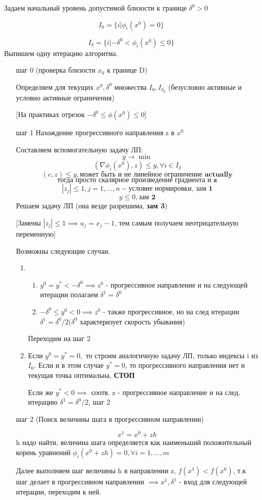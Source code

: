 \documentclass[a4paper]{article}
\theoremstyle{definition}
\theoremstyle{remark}
\begin{document}
Задаем начальный уровень допустимой близости к границе $\delta^0>0$

\[I_0 = \{i | \phi_i(x^0) = 0\}\]

\[I_\delta = \{i | -\delta^0<\phi_i(x^0) \leq 0\}\]
Выпишем одну итерацию алгоритма.
\begin{enumerate}
    \item[шаг 0] (проверка близости $x_0$ к границе D)

    Определяем для текущих $x^0, \delta^0$ множества $I_0, I_{\delta_0}$
    (безусловно активные и условно активные ограничения)
    
    [На практиках отрезок $-\delta^0 \le \phi(x^0) \le 0$]
    \item[шаг 1] Нахождение прогрессивного направления z в $x^0$

    Составляем вспомогательную задачу ЛП:
    \[y\to \min\]
    \[(\nabla \phi_i(x^0), z)\le y ,\forall i \in I_\delta\]
    \[(c, z)\le y, \textbf{может быть и не линейное ограничение actually}\]
    \[\textbf{тогда просто скалярное произведение градиента и z}\]
    \[|z_j|\le 1, j = 1, \dots, n - \text{условие нормировки, }\textbf{зам 1}\]
    \[y \le 0, \textbf{зам 2}\]
    Решаем задачу ЛП (она везде разрешима, \textbf{зам 3})

    [Замены $|z_j|\le 1\implies u_j = x_j - 1$, тем самым получаем неотрицательную переменную]

    Возможны следующие случаи.
    \begin{enumerate}
        \item \begin{enumerate}
            \item $y^0 = y^* < -\delta^0\implies z^0$ - прогрессивное направление и на следующей итерации полагаем $\delta^1 = \delta^0$
            \item $-\delta^0 \le y^0 < 0 \implies z^0$ - также прогрессивное, но на след итерации $\delta^1 = \delta^0/2$($\delta^0$ характеризует скорость убывания)
        \end{enumerate}
        Переходим на шаг 2
        \item Если $y^0 = y^* = 0, $ то строим аналогичную задачу ЛП, только индексы i из $I_0$. Если и в этом случае $y^* = 0$, то прогрессивного направления нет и текущая точка оптимальна, \textbf{СТОП}

        Если же $y^* < 0\implies$ соотв. z - прогрессивное направление и на след. итерацию $\delta^1 = \delta^0 /2$, шаг 2
    \end{enumerate}
    \item[шаг 2](Поиск величины шага в прогрессивном направлении)

    \[x^1 = x^0 + zh\]
    h надо найти, величина шага определяется как наименьший положительный корень уравнений $\phi_i(x^0 +zh) = 0, \forall i = 1, \dots, m$

    Далее выполняем шаг величины h в направлении z, $f(x^1) < f(x^0)$, т.к шаг делает в прогрессивном направлении $\implies x^1, \delta^1$ - вход для следующей итерации, переходим к ней.
\end{enumerate}
\end{document}
